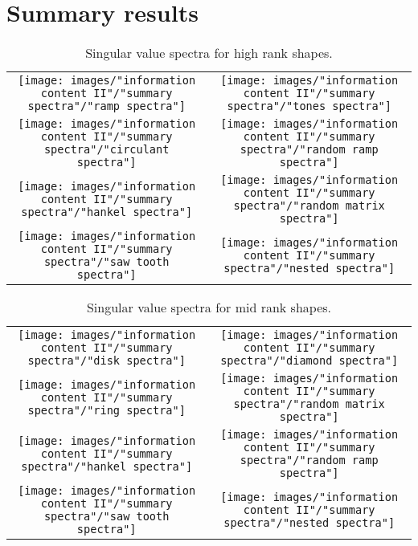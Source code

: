 \section{Summary results}

\begin{table}[htdp]
\caption[Singular value spectra for high rank shapes]{Singular value spectra for high rank shapes.}
\begin{center}
\begin{tabular}{cc}
%
  \texttt{[image: images/"information content II"/"summary spectra"/"ramp spectra"]} &
%
  \texttt{[image: images/"information content II"/"summary spectra"/"tones spectra"]} \\
%
  \texttt{[image: images/"information content II"/"summary spectra"/"circulant spectra"]} &
%
  \texttt{[image: images/"information content II"/"summary spectra"/"random ramp spectra"]} \\
%
  \texttt{[image: images/"information content II"/"summary spectra"/"hankel spectra"]} &
%
  \texttt{[image: images/"information content II"/"summary spectra"/"random matrix spectra"]} \\
%
  \texttt{[image: images/"information content II"/"summary spectra"/"saw tooth spectra"]} &
%
  \texttt{[image: images/"information content II"/"summary spectra"/"nested spectra"]}
%
\end{tabular}
\end{center}
\label{tab:spectra:summary:high}
\end{table}


\begin{table}[htdp]
\caption[Singular value spectra for mid rank shapes]{Singular value spectra for mid rank shapes.}
\begin{center}
\begin{tabular}{cc}
%
  \texttt{[image: images/"information content II"/"summary spectra"/"disk spectra"]} &
%
  \texttt{[image: images/"information content II"/"summary spectra"/"diamond spectra"]} \\
%
  \texttt{[image: images/"information content II"/"summary spectra"/"ring spectra"]} &
%
  \texttt{[image: images/"information content II"/"summary spectra"/"random matrix spectra"]} \\
%
  \texttt{[image: images/"information content II"/"summary spectra"/"hankel spectra"]} &
%
  \texttt{[image: images/"information content II"/"summary spectra"/"random ramp spectra"]} \\
%
  \texttt{[image: images/"information content II"/"summary spectra"/"saw tooth spectra"]} &
%
  \texttt{[image: images/"information content II"/"summary spectra"/"nested spectra"]}
%
\end{tabular}
\end{center}
\label{tab:spectra:summary:mid}
\end{table}

\endinput